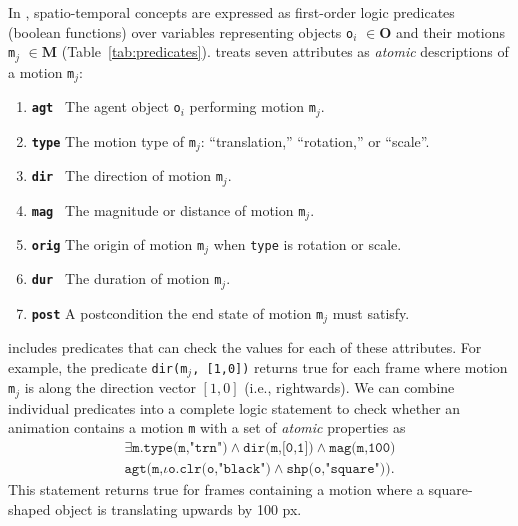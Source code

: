 In \dslname{}, spatio-temporal concepts are expressed as
first-order logic predicates (boolean functions)
over variables representing objects {\tt o$_i$} $\in \mathbf{O}$ and
their motions {\tt m$_j$} $\in \mathbf{M}$
(Table~\ref{tab:predicates}).
%
\dslname{} treats seven attributes as 
{\em atomic} descriptions of a motion {\tt m$_j$}:
\begin{enumerate}[leftmargin=0.5cm]
    \item {\tt \bf agt } The agent object {\tt o$_i$} performing motion {\tt m$_j$}.
    \item {\tt \bf type}  The motion type of {\tt m$_j$}: ``translation,'' ``rotation,'' or ``scale''. 
    \item {\tt \bf dir } The direction of motion {\tt m$_j$}.
    \item {\tt \bf mag } The magnitude or distance of motion {\tt m$_j$}.
    \item {\tt \bf orig} The origin of motion {\tt m$_j$} when {\tt type} is rotation or scale.
    \item {\tt \bf dur } The duration of motion {\tt m$_j$}.
    \item {\tt \bf post} A postcondition the end state of motion {\tt m$_j$} must satisfy.
\end{enumerate}
\dslname{} includes predicates that can check the values for each of these
attributes. For example, the predicate {\tt dir(m$_j$, [1,0])} returns
true for each frame where motion {\tt m$_j$} is along the direction vector
$[1,0]$ (i.e., rightwards).
%
We can combine individual predicates into a complete logic statement
to check whether an animation contains a motion {\tt m} with a set of \textit{atomic} properties as
\begin{multline}
\exists \texttt{m.type(m,"trn")}\land\texttt{dir(m,[0,1])}\land\texttt{mag(m,100)}\\ \texttt{agt(m,$\iota$o.clr(o,"black")}\land\texttt{shp(o,"square"))}.
\end{multline}
This statement returns true for frames containing a motion where a
square-shaped object is translating upwards by 100 px.

